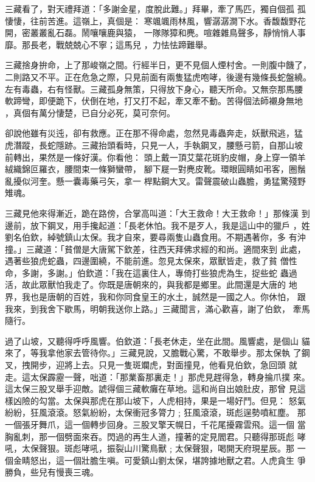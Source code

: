 \begin{pinyinscope}
{三藏看了，對天禮拜道：「多謝金星，度脫此難。」拜畢，牽了馬匹，獨自個孤
孤悽悽，往前苦進。這嶺上，真個是：
寒颯颯雨林風，響潺潺澗下水。香馥馥野花開，密叢叢亂石磊。鬧嚷嚷鹿與猿，
一隊隊獐和麂。喧雜雜鳥聲多，靜悄悄人事靡。那長老，戰兢兢心不寧；這馬兒
，力怯怯蹄難舉。

三藏捨身拚命，上了那峻嶺之間。行經半日，更不見個人煙村舍。一則腹中饑了，
二則路又不平。正在危急之際，只見前面有兩隻猛虎咆哮，後邊有幾條長蛇盤繞。
左有毒蟲，右有怪獸。三藏孤身無策，只得放下身心，聽天所命。又無奈那馬腰
軟蹄彎，即便跪下，伏倒在地，打又打不起，牽又牽不動。苦得個法師襯身無地
，真個有萬分悽楚，已自分必死，莫可奈何。

卻說他雖有災迍，卻有救應。正在那不得命處，忽然見毒蟲奔走，妖獸飛逃，猛
虎潛蹤，長蛇隱跡。三藏抬頭看時，只見一人，手執鋼叉，腰懸弓箭，自那山坡
前轉出，果然是一條好漢。你看他：
頭上戴一頂艾葉花斑豹皮帽，身上穿一領羊絨織錦叵羅衣，腰間束一條獅蠻帶，
腳下屣一對麂皮靴。環眼圓睛如弔客，圈鬚亂擾似河奎。懸一囊毒藥弓矢，拿一
桿點鋼大叉。雷聲震破山蟲膽，勇猛驚殘野雉魂。

三藏見他來得漸近，跪在路傍，合掌高叫道：「大王救命！大王救命！」那條漢
到邊前，放下鋼叉，用手攙起道：「長老休怕。我不是歹人，我是這山中的獵戶
，姓劉名伯欽，綽號鎮山太保。我才自來，要尋兩隻山蟲食用。不期遇著你，多
有沖撞。」三藏道：「貧僧是大唐駕下欽差，往西天拜佛求經的和尚。適間來到
此處，遇著些狼虎蛇蟲，四邊圍繞，不能前進。忽見太保來，眾獸皆走，救了貧
僧性命，多謝，多謝。」伯欽道：「我在這裏住人，專倚打些狼虎為生，捉些蛇
蟲過活，故此眾獸怕我走了。你既是唐朝來的，與我都是鄉里。此間還是大唐的
地界，我也是唐朝的百姓，我和你同食皇王的水土，誠然是一國之人。你休怕，
跟我來，到我舍下歇馬，明朝我送你上路。」三藏聞言，滿心歡喜，謝了伯欽，
牽馬隨行。

過了山坡，又聽得呼呼風響。伯欽道：「長老休走，坐在此間。風響處，是個山
貓來了，等我拿他家去管待你。」三藏見說，又膽戰心驚，不敢舉步。那太保執
了鋼叉，拽開步，迎將上去。只見一隻斑斕虎，對面撞見，他看見伯欽，急回頭
就走。這太保霹靂一聲，咄道：「那業畜那裏走！」那虎見趕得急，轉身掄爪撲
來。這太保三股叉舉手迎敵。諕得個三藏軟癱在草地。這和尚自出娘肚皮，那曾
見這樣凶險的勾當。太保與那虎在那山坡下，人虎相持，果是一場好鬥。但見：
怒氣紛紛，狂風滾滾。怒氣紛紛，太保衝冠多膂力﹔狂風滾滾，斑彪逞勢噴紅塵。
那一個張牙舞爪，這一個轉步回身。三股叉擎天幌日，千花尾擾霧雲飛。這一個
當胸亂刺，那一個劈面來吞。閃過的再生人道，撞著的定見閻君。只聽得那斑彪
哮吼，太保聲狠。斑彪哮吼，振裂山川驚鳥獸﹔太保聲狠，喝開天府現星辰。那
一個金睛怒出，這一個壯膽生嗔。可愛鎮山劉太保，堪誇據地獸之君。人虎貪生
爭勝負，些兒有慢喪三魂。

}
\end{pinyinscope}
